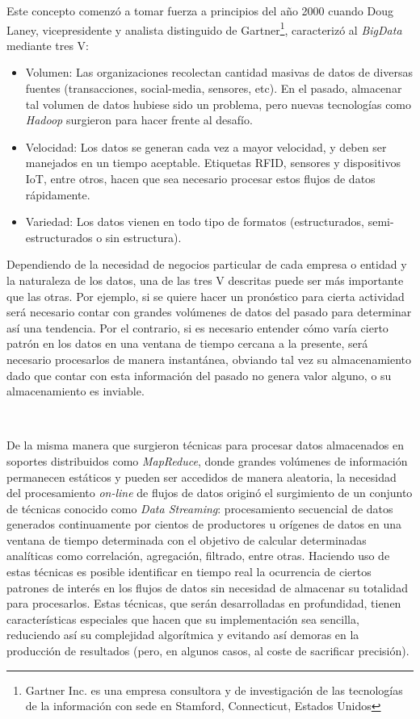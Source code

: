 \documentclass[a4paper,12pt, oneside]{article}
\begin{document}
Este concepto comenzó a tomar fuerza a principios del año 2000 cuando Doug Laney, vicepresidente y analista distinguido de Gartner\footnote{Gartner Inc. es una empresa consultora y de investigación de las tecnologías de la información con sede en Stamford, Connecticut, Estados Unidos}, caracterizó al \textit{BigData} mediante tres V:
\begin{itemize}
	\item Volumen: Las organizaciones recolectan cantidad masivas de datos de diversas fuentes (transacciones, social-media, sensores, etc). En el pasado, almacenar tal volumen de datos hubiese sido un problema, pero nuevas tecnologías como \textit{Hadoop} surgieron para hacer frente al desafío.
	\item Velocidad: Los datos se generan cada vez a mayor velocidad, y deben ser manejados en un tiempo aceptable. Etiquetas RFID, sensores y dispositivos IoT, entre otros, hacen que sea necesario procesar estos flujos de datos rápidamente.
	\item Variedad: Los datos vienen en todo tipo de formatos (estructurados, semi-estructurados o sin estructura).
\end{itemize}

Dependiendo de la necesidad de negocios particular de cada empresa o entidad y la naturaleza de los datos, una de las tres V descritas puede ser más importante que las otras. Por ejemplo, si se quiere hacer un pronóstico para cierta actividad será necesario contar con grandes volúmenes de datos del pasado para determinar así una tendencia. Por el contrario, si es necesario entender cómo varía cierto patrón en los datos en una ventana de tiempo cercana a la presente, será necesario procesarlos de manera instantánea, obviando tal vez su almacenamiento dado que contar con esta información del pasado no genera valor alguno, o su almacenamiento es inviable.

\

De la misma manera que surgieron técnicas para procesar datos almacenados en soportes distribuidos como \textit{MapReduce}\cite{Dean:2004:MSD:1251254.1251264}, donde grandes volúmenes de información permanecen estáticos y pueden ser accedidos de manera aleatoria, la necesidad del procesamiento \textit{on-line} de flujos de datos originó el surgimiento de un conjunto de técnicas conocido como \textit{Data Streaming}: procesamiento secuencial de datos generados continuamente por cientos de productores u orígenes de datos en una ventana de tiempo determinada con el objetivo de calcular determinadas analíticas como correlación, agregación, filtrado, entre otras. Haciendo uso de estas técnicas es posible identificar en tiempo real la ocurrencia de ciertos patrones de interés en los flujos de datos sin necesidad de almacenar su totalidad para procesarlos. Estas técnicas, que serán desarrolladas en profundidad, tienen características especiales que hacen que su implementación sea sencilla, reduciendo así su complejidad algorítmica y evitando así demoras en la producción de resultados (pero, en algunos casos, al coste de sacrificar precisión).
\end{document}
